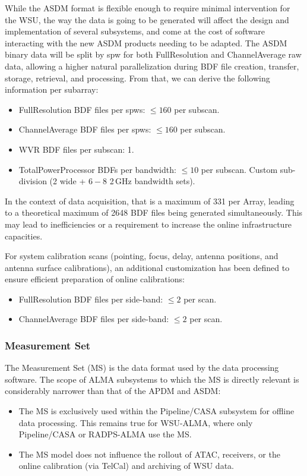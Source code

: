 While the ASDM format is flexible enough to require minimal intervention for the WSU, the way the data is going to be generated will affect the design and implementation of several subsystems, and come at the cost of software interacting with the new ASDM products needing to be adapted. The ASDM binary data will be split by spw for both FullResolution and ChannelAverage raw data, allowing a higher natural parallelization during \ac{BDF} file creation, transfer, storage, retrieval, and processing. From that, we can derive the following information per subarray:
\begin{itemize}[itemsep=-0.5em]
    \item FullResolution \ac{BDF} files per spws: $\leq 160$ per subscan.
    \item ChannelAverage \ac{BDF} files per spws: $\leq 160$ per subscan.
    \item WVR \ac{BDF} files per subscan: 1.
    \item TotalPowerProcessor BDFs per bandwidth: $\leq 10$ per subscan. Custom sub-division (2 wide + $6-8$ 2\,GHz bandwidth sets).
\end{itemize}

In the context of data acquisition, that is a maximum of 331 per Array, leading to a theoretical maximum of 2648 \ac{BDF} files being generated simultaneously. This may lead to inefficiencies or a requirement to increase the online infrastructure capacities.

For system calibration scans (pointing, focus, delay, antenna positions, and antenna surface calibrations), an additional customization has been defined to ensure efficient preparation of online calibrations:
\begin{itemize}[itemsep=-0.5em]
    \item FullResolution \ac{BDF} files per side-band: $\leq 2$ per scan.
    \item ChannelAverage \ac{BDF} files per side-band: $\leq 2$ per scan.
\end{itemize}

\subsubsection{Measurement Set}
\label{MSchanges}
The Measurement Set (MS) is the data format used by the data processing software. The scope of ALMA subsystems to which the MS is directly relevant is considerably narrower than that of the APDM and ASDM:
\begin{itemize}[itemsep=-0.5em]
\item The MS is exclusively used within the Pipeline/CASA subsystem for offline data processing. This remains true for WSU-ALMA, where only Pipeline/CASA or RADPS-ALMA use the MS.
\item The MS model does not influence the rollout of ATAC, receivers, or the online calibration (via TelCal) and archiving of WSU data.
\end{itemize}


